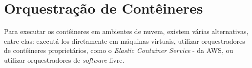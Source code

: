 



\section{Orquestração de Contêineres}

Para executar os contêineres em ambientes de nuvem, existem várias alternativas, entre elas: executá-los diretamente em máquinas virtuais, utilizar orquestradores de contêineres proprietários, como o \textit{Elastic Container Service} - \cite{awsecs} da AWS, ou utilizar orquestradores de \textit{software} livre.



